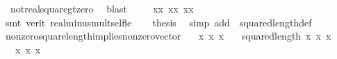 \begin{isabellebody}
\ {}\ not{\isacharunderscore}{\kern0pt}real{\isacharunderscore}{\kern0pt}square{\isacharunderscore}{\kern0pt}gt{\isacharunderscore}{\kern0pt}zero\ \isamarkupfalse%
\ blast\isanewline
\ \ \isamarkupfalse%
\ {}{\isacharcolon}{\kern0pt}\ {\isachardoublequoteopen}x{}{\isacharasterisk}{\kern0pt}x{}\ {\isacharplus}{\kern0pt}x{}{\isacharasterisk}{\kern0pt}x{}\ {\isacharplus}{\kern0pt}x{}{\isacharasterisk}{\kern0pt}x{}\ {\isachargreater}{\kern0pt}\ {}{\isachardoublequoteclose}\ \isamarkupfalse%
\ {}\ \isamarkupfalse%
\ {\isacharparenleft}{\kern0pt}smt\ {\isacharparenleft}{\kern0pt}verit{\isacharparenright}{\kern0pt}\ real{\isacharunderscore}{\kern0pt}minus{\isacharunderscore}{\kern0pt}mult{\isacharunderscore}{\kern0pt}self{\isacharunderscore}{\kern0pt}le{\isacharparenright}{\kern0pt}\isanewline
\ \ \isamarkupfalse%
\ {\isacharquery}{\kern0pt}thesis\ \isamarkupfalse%
\ {\isacharparenleft}{\kern0pt}simp\ add{\isacharcolon}{\kern0pt}\ {\isachardoublequoteopen}{}{\isachardoublequoteclose}\ squared{\isacharunderscore}{\kern0pt}length{\isacharunderscore}{\kern0pt}def{\isacharparenright}{\kern0pt}\isanewline
{}\isamarkupfalse%
%
\endisatagproof
{\isafoldproof}%
%
\isadelimproof
\isanewline
%
\endisadelimproof
\isanewline
{}\isamarkupfalse%
\ nonzero{\isacharunderscore}{\kern0pt}square{\isacharunderscore}{\kern0pt}length{\isacharunderscore}{\kern0pt}implies{\isacharunderscore}{\kern0pt}nonzero{\isacharunderscore}{\kern0pt}vector{\isacharcolon}{\kern0pt}\isanewline
\ \ \ x{}\ x{}\ x{}\isanewline
\ \ \ {\isachardoublequoteopen}squared{\isacharunderscore}{\kern0pt}length\ {\isacharparenleft}{\kern0pt}x{}{\isacharcomma}{\kern0pt}\ x{}{\isacharcomma}{\kern0pt}\ x{}{\isacharparenright}{\kern0pt}\ {\isachargreater}{\kern0pt}\ {}{\isachardoublequoteclose}\isanewline
\ \ \ {\isachardoublequoteopen}{\isacharparenleft}{\kern0pt}x{}{\isacharcomma}{\kern0pt}\ x{}{\isacharcomma}{\kern0pt}\ x{}{\isacharparenright}{\kern0pt}\ {\isasymnoteq}\ {\isacharparenleft}{\kern0pt}{}{\isacharcomma}{\kern0pt}{}{\isacharcomma}{\kern0pt}{}{\isacharparenright}{\kern0pt}{\isachardoublequoteclose}\isanewline

\end{isabellebody}
